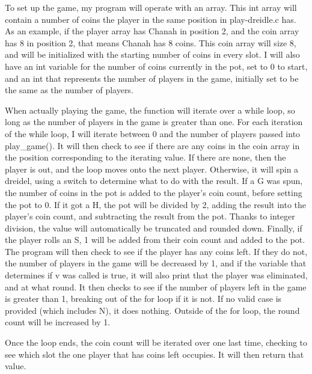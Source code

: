\documentclass[11pt]{article}
\begin{document}
 To set up the game, my program will operate with an array. This int array will contain a number of coins the player in the same position in play-dreidle.c has. As an example, if the player array has Chanah in position 2, and the coin array has 8 in position 2, that means Chanah has 8 coins. This coin array will size 8, and will be initialized with the starting number of coins in every slot. I will also have an int variable for the number of coins currently in the pot, set to 0 to start, and an int that represents the number of players in the game, initially set to be the same as the number of players.

When actually playing the game, the function will iterate over a while loop, so long as the number of players in the game is greater than one. For each iteration of the while loop, I will iterate between 0 and the number of players passed into play\_game(). It will then check to see if there are any coins in the coin array in the position corresponding to the iterating value. If there are none, then the player is out, and the loop moves onto the next player. Otherwise, it will spin a dreidel, using a switch to determine what to do with the result. If a G was spun, the number of coins in the pot is added to the player's coin count, before setting the pot to 0. If it got a H, the pot will be divided by 2, adding the result into the player's coin count, and subtracting the result from the pot. Thanks to integer division, the value will automatically be truncated and rounded down. Finally, if the player rolls an S, 1 will be added from their coin count and added to the pot. The program will then check to see if the player has any coins left. If they do not, the number of players in the game will be decreased by 1, and if the variable that determines if v was called is true, it will also print that the player was eliminated, and at what round. It then checks to see if the number of players left in the game is greater than 1, breaking out of the for loop if it is not. If no valid case is provided (which includes N), it does nothing. Outside of the for loop, the round count will be increased by 1.

Once the loop ends, the coin count will be iterated over one last time, checking to see which slot the one player that has coins left occupies. It will then return that value.
\end{document}
